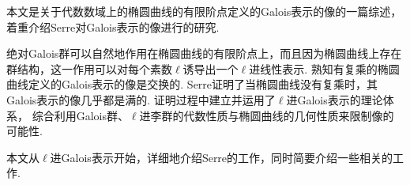 本文是关于代数数域上的椭圆曲线的有限阶点定义的Galois表示的像的一篇综述，着重介绍Serre对Galois表示的像进行的研究.

绝对Galois群可以自然地作用在椭圆曲线的有限阶点上，而且因为椭圆曲线上存在群结构，这一作用可以对每个素数$\ell$诱导出一个$\ell$进线性表示.
熟知有复乘的椭圆曲线定义的Galois表示的像是交换的.
Serre证明了当椭圆曲线没有复乘时，其Galois表示的像几乎都是满的.
证明过程中建立并运用了$\ell$进Galois表示的理论体系，
综合利用Galois群、$\ell$进李群的代数性质与椭圆曲线的几何性质来限制像的可能性.

本文从$\ell$进Galois表示开始，详细地介绍Serre的工作，同时简要介绍一些相关的工作.
